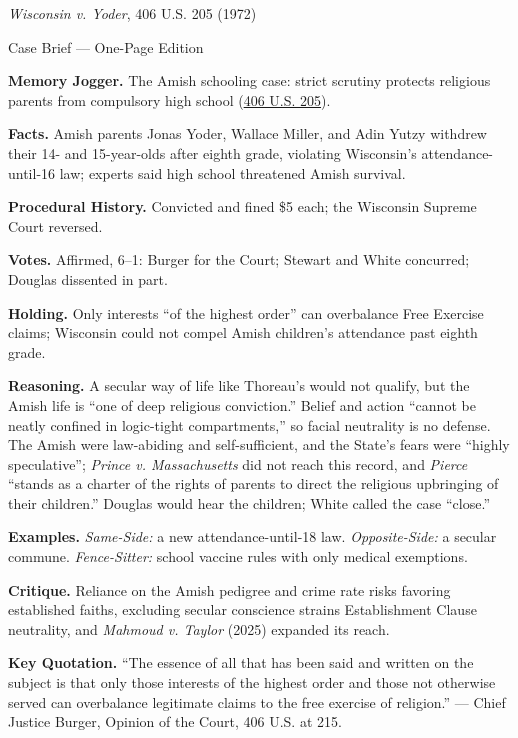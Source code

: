 \documentclass[12pt]{article}
\begin{document}
\begin{center}
{\Large \textit{Wisconsin v. Yoder}, 406 U.S. 205 (1972)\par}
\vspace{0.3em}
{\normalsize Case Brief --- One-Page Edition\par}
\end{center}

\textbf{Memory Jogger.} The Amish schooling case: strict scrutiny protects religious parents from compulsory high school (\href{https://supreme.justia.com/cases/federal/us/406/205/}{406 U.S. 205}).

\textbf{Facts.} Amish parents Jonas Yoder, Wallace Miller, and Adin Yutzy withdrew their 14- and 15-year-olds after eighth grade, violating Wisconsin's attendance-until-16 law; experts said high school threatened Amish survival.

\textbf{Procedural History.} Convicted and fined \$5 each; the Wisconsin Supreme Court reversed.

\textbf{Votes.} Affirmed, 6--1: Burger for the Court; Stewart and White concurred; Douglas dissented in part.

\textbf{Holding.} Only interests ``of the highest order'' can overbalance Free Exercise claims; Wisconsin could not compel Amish children's attendance past eighth grade.

\textbf{Reasoning.} A secular way of life like Thoreau's would not qualify, but the Amish life is ``one of deep religious conviction.'' Belief and action ``cannot be neatly confined in logic-tight compartments,'' so facial neutrality is no defense. The Amish were law-abiding and self-sufficient, and the State's fears were ``highly speculative''; \textit{Prince v. Massachusetts} did not reach this record, and \textit{Pierce} ``stands as a charter of the rights of parents to direct the religious upbringing of their children.'' Douglas would hear the children; White called the case ``close.''

\textbf{Examples.} \emph{Same-Side:} a new attendance-until-18 law. \emph{Opposite-Side:} a secular commune. \emph{Fence-Sitter:} school vaccine rules with only medical exemptions.

\textbf{Critique.} Reliance on the Amish pedigree and crime rate risks favoring established faiths, excluding secular conscience strains Establishment Clause neutrality, and \textit{Mahmoud v. Taylor} (2025) expanded its reach.

\textbf{Key Quotation.} ``The essence of all that has been said and written on the subject is that only those interests of the highest order and those not otherwise served can overbalance legitimate claims to the free exercise of religion.'' --- Chief Justice Burger, Opinion of the Court, 406 U.S. at 215.
\end{document}
